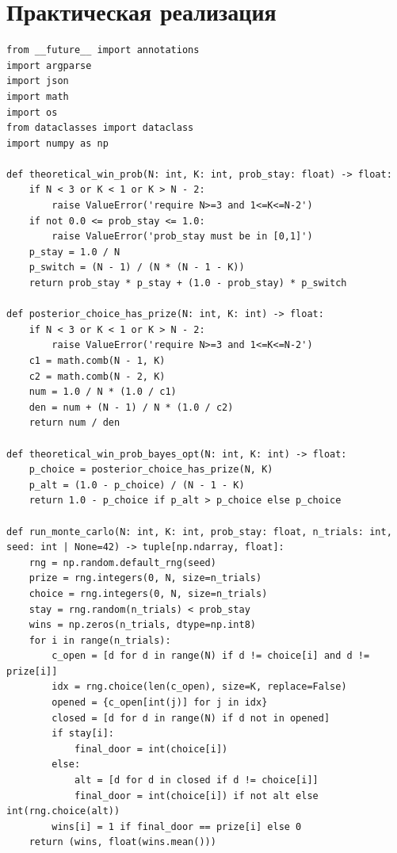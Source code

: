 \documentclass[a4paper, 14pt]{extarticle}
\begin{document}
\section{Практическая реализация}
\newenvironment{longlisting}{\captionsetup{type=listing}}{}
\begin{longlisting}
\caption{Модель}
\begin{verbatim}
from __future__ import annotations
import argparse
import json
import math
import os
from dataclasses import dataclass
import numpy as np

def theoretical_win_prob(N: int, K: int, prob_stay: float) -> float:
    if N < 3 or K < 1 or K > N - 2:
        raise ValueError('require N>=3 and 1<=K<=N-2')
    if not 0.0 <= prob_stay <= 1.0:
        raise ValueError('prob_stay must be in [0,1]')
    p_stay = 1.0 / N
    p_switch = (N - 1) / (N * (N - 1 - K))
    return prob_stay * p_stay + (1.0 - prob_stay) * p_switch

def posterior_choice_has_prize(N: int, K: int) -> float:
    if N < 3 or K < 1 or K > N - 2:
        raise ValueError('require N>=3 and 1<=K<=N-2')
    c1 = math.comb(N - 1, K)
    c2 = math.comb(N - 2, K)
    num = 1.0 / N * (1.0 / c1)
    den = num + (N - 1) / N * (1.0 / c2)
    return num / den

def theoretical_win_prob_bayes_opt(N: int, K: int) -> float:
    p_choice = posterior_choice_has_prize(N, K)
    p_alt = (1.0 - p_choice) / (N - 1 - K)
    return 1.0 - p_choice if p_alt > p_choice else p_choice

def run_monte_carlo(N: int, K: int, prob_stay: float, n_trials: int, seed: int | None=42) -> tuple[np.ndarray, float]:
    rng = np.random.default_rng(seed)
    prize = rng.integers(0, N, size=n_trials)
    choice = rng.integers(0, N, size=n_trials)
    stay = rng.random(n_trials) < prob_stay
    wins = np.zeros(n_trials, dtype=np.int8)
    for i in range(n_trials):
        c_open = [d for d in range(N) if d != choice[i] and d != prize[i]]
        idx = rng.choice(len(c_open), size=K, replace=False)
        opened = {c_open[int(j)] for j in idx}
        closed = [d for d in range(N) if d not in opened]
        if stay[i]:
            final_door = int(choice[i])
        else:
            alt = [d for d in closed if d != choice[i]]
            final_door = int(choice[i]) if not alt else int(rng.choice(alt))
        wins[i] = 1 if final_door == prize[i] else 0
    return (wins, float(wins.mean()))


\end{verbatim}
\end{longlisting}
\end{document}
